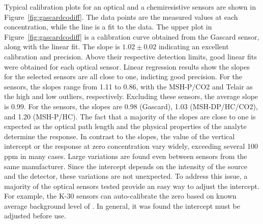 \documentclass[sensors,article,submit,moreauthors,pdftex]{Definitions/mdpi}
\begin{document}
			Typical calibration plots for an optical and a chemiresistive sensors are shown in Figure~\ref{fig:gascardcodiff}.
			The data points are the measured values at each concentration, while the line is a fit to the data.
			The upper plot in Figure~\ref{fig:gascardcodiff} is a calibration curve obtained from the Gascard sensor, along with the linear fit.
			The slope is $1.02\pm 0.02$ indicating an excellent calibration and precision.
			Above their respective detection limits, good linear fits were obtained for each optical sensor.
			Linear regression results show the slopes for the selected sensors are all close to one, indicting good precision.
			For the  sensors, the slopes range from 1.11 to 0.86, with the MSH-P/CO2 and Telair as the high and low outliers, respectively.
			Excluding these sensors, the average slope is 0.99.
			For the  sensors, the slopes are 0.98 (Gascard), 1.03 (MSH-DP/HC/CO2), and 1.20 (MSH-P/HC).
			The fact that a majority of the slopes are close to one is expected as the optical path length and the physical properties of the analyte determine the response.
			In contrast to the slopes, the value of the vertical intercept or the response at zero concentration vary widely, exceeding several 100 ppm in many cases.
			Large variations are found even between sensors from the same manufacturer.
			Since the intercept depends on the intensity of the source and the detector, these variations are not unexpected.
			To address this issue, a majority of the optical sensors tested provide an easy way to adjust the intercept.
			For example, the K-30 sensors can auto-calibrate the zero based on known average background level of .
			In general, it was found the intercept must be adjusted before use.
			
\end{document}

